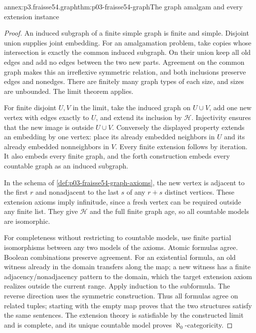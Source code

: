 \begin{annexitem}{annex:p3.fraisse54.graph}{thm:p03-fraisse54-graph}{The graph amalgam and every extension instance}
\begin{proof}
An induced subgraph of a finite simple graph is finite and simple. Disjoint
union supplies joint embedding. For an amalgamation problem, take copies
whose intersection is exactly the common induced subgraph. On their union
keep all old edges and add no edges between the two new parts. Agreement
on the common graph makes this an irreflexive symmetric relation, and both
inclusions preserve edges and nonedges. There are finitely many graph types
of each size, and sizes are unbounded. The limit theorem applies.

For finite disjoint \(U,V\) in the limit, take the induced graph on
\(U\cup V\), add one new vertex with edges exactly to \(U\), and
extend its inclusion by \(\mathcal H\). Injectivity ensures that the
new image is outside \(U\cup V\). Conversely the displayed property
extends an embedding by one vertex: place its already embedded neighbors
in \(U\) and its already embedded nonneighbors in \(V\). Every finite
extension follows by iteration. It also embeds every finite graph, and
the forth construction embeds every countable graph as an induced subgraph.

In the schema of \cref{def:p03-fraisse54-graph-axioms}, the new vertex is
adjacent to the first \(r\) and nonadjacent to the last \(s\) of any
\(r+s\) distinct vertices. These extension axioms imply
infinitude, since a fresh vertex can be required outside any finite list.
They give \(\mathcal H\) and the full finite graph age, so all countable
models are isomorphic.

For completeness without restricting to countable models, use finite
partial isomorphisms between any two models of the axioms. Atomic formulas
agree. Boolean combinations preserve agreement. For an existential formula,
an old witness already in the domain transfers along the map; a new witness
has a finite adjacency/nonadjacency pattern to the domain, which the target
extension axiom realizes outside the current range. Apply induction to the
subformula. The reverse direction uses the symmetric construction. Thus
all formulas agree on related tuples; starting with the empty map proves
that the two structures satisfy the same sentences. The extension theory
is satisfiable by the constructed limit and is complete, and its unique
countable model proves \(\aleph_0\)-categoricity.
\end{proof}
\end{annexitem}

